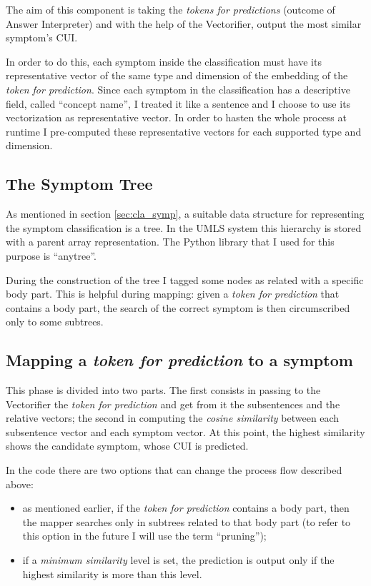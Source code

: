 The aim of this component is taking the \textit{tokens for predictions} (outcome of Answer Interpreter) and with the help of the Vectorifier, output the most similar symptom's CUI.

In order to do this, each symptom inside the classification must have its representative vector of the same type and dimension of the embedding of the \textit{token for prediction}. Since each symptom in the classification has a descriptive field, called ``concept name'', I treated it like a sentence and I choose to use its vectorization as representative vector. In order to hasten the whole process at runtime I pre-computed these representative vectors for each supported type and dimension.

\subsection{The Symptom Tree}
As mentioned in section \ref{sec:cla_symp}, a suitable data structure for representing the symptom classification is a tree. In the UMLS system this hierarchy is stored with a parent array representation. The Python library that I used for this purpose is ``anytree''.

During the construction of the tree I tagged some nodes as related with a specific body part. This is helpful during mapping: given a \textit{token for prediction} that contains a body part, the search of the correct symptom is then circumscribed only to some subtrees.

\subsection{Mapping a \textit{token for prediction} to a symptom}
This phase is divided into two parts. The first consists in passing to the Vectorifier the \textit{token for prediction} and get from it the subsentences and the relative vectors; the second in computing the \textit{cosine similarity} between each subsentence vector and each symptom vector. At this point, the highest similarity shows the candidate symptom, whose CUI is predicted.

In the code there are two options that can change the process flow described above:
\begin{itemize}
  \item as mentioned earlier, if the \textit{token for prediction} contains a body part, then the mapper searches only in subtrees related to that body part (to refer to this option in the future I will use the term ``pruning'');
  \item if a \textit{minimum similarity} level is set, the prediction is output only if the highest similarity is more than this level. 
\end{itemize}
